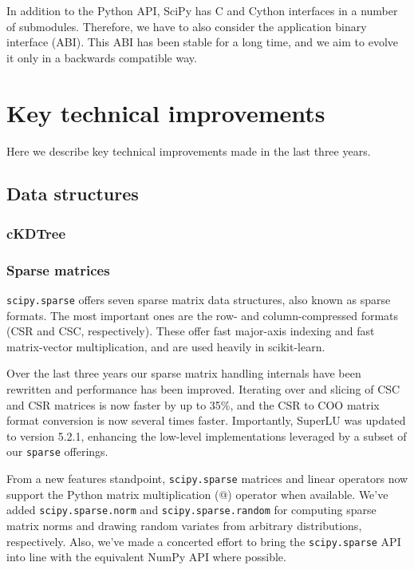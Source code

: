 \documentclass[fleqn,10pt]{wlscirep}
\begin{document}
In addition to the Python API, SciPy has C and Cython interfaces in a number
of submodules. Therefore, we have to also consider the application binary
interface (ABI). This ABI has been stable for a long time, and we aim to
evolve it only in a backwards compatible way.

\section*{Key technical improvements}

Here we describe key technical improvements made in the last three years.

\subsection*{Data structures}

\subsubsection*{cKDTree}



\subsubsection*{Sparse matrices}

\texttt{scipy.sparse} offers seven sparse matrix data structures,
also known as sparse formats. The most important ones are the row- 
and column-compressed formats (CSR and CSC, respectively). 
These offer fast major-axis indexing and fast matrix-vector multiplication,
and are used heavily in scikit-learn.

Over the last three years our sparse matrix handling internals have been
rewritten and performance has been improved. Iterating over and slicing of CSC
and CSR matrices is now faster by up to 35\%, and the CSR to COO matrix format
conversion is now several times faster.  Importantly,
SuperLU\cite{superlu_ug99} was updated to version 5.2.1, enhancing the
low-level implementations leveraged by a subset of our \texttt{sparse}
offerings.

From a new features standpoint, \texttt{scipy.sparse} matrices and linear
operators now support the Python matrix multiplication (@) operator when
available. We've added \texttt{scipy.sparse.norm} and
\texttt{scipy.sparse.random} for computing sparse matrix norms and drawing
random variates from arbitrary distributions, respectively. Also, we've made a
concerted effort to bring the \texttt{scipy.sparse} API into line with the
equivalent NumPy API where possible.
\end{document}
